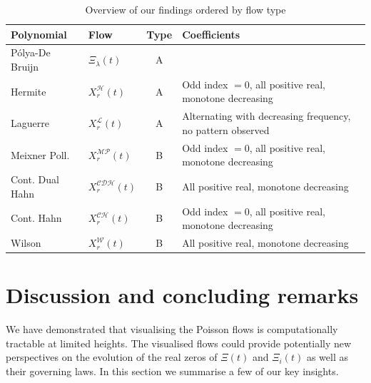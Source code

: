\documentclass[a4paper,11pt,twoside]{amsart}
\begin{document}
\begin{table}[H]
  \begin{center}
    \caption{Overview of our findings ordered by flow type }
    \label{tab:tablefindings}
    \begin{tabular}{l|l|c|l|} 
      Polynomial & Flow & Type & Coefficients\\
      \hline
      Pólya-De Bruijn & $\Xi_{\lambda}(t)$ & A\\
      Hermite & $X^\mathcal{H}_r(t)$  & A & Odd index $= 0$, all positive real, monotone decreasing\\
      Laguerre & $X^\mathcal{L}_r(t)$  & A & Alternating with decreasing frequency, no pattern observed\\
      Meixner Poll. & $X^\mathcal{MP}_r(t)$  & B & Odd index $= 0$, all positive real, monotone decreasing\\
      Cont. Dual Hahn & $X^\mathcal{CDH}_r(t)$  & B & All positive real, monotone decreasing\\
      Cont. Hahn & $X^\mathcal{CH}_r(t)$  & B & Odd index $= 0$, all positive real, monotone decreasing\\
      Wilson & $X^\mathcal{W}_r(t)$  & B & All positive real, monotone decreasing\\
    \end{tabular}
  \end{center}
\end{table}

\section{Discussion and concluding remarks}\label{concremarks}

We have demonstrated that visualising the Poisson flows is computationally tractable at limited heights. The visualised flows could provide potentially new perspectives on the evolution of the real zeros of $\Xi(t)$ and $\Xi_i(t)$ as well as their governing laws. In this section we summarise a few of our key insights.
 
\end{document}
